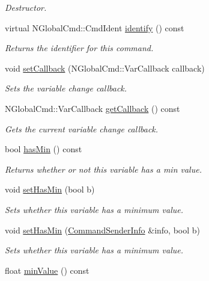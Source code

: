 \begin{DoxyCompactItemize}
\begin{DoxyCompactList}\small\item\em Destructor. \end{DoxyCompactList}\item 
virtual N\-Global\-Cmd\-::\-Cmd\-Ident \hyperlink{class_con_var_a0d2fb6068e6fa0ac6b1655327c453d6b}{identify} () const 
\begin{DoxyCompactList}\small\item\em Returns the identifier for this command. \end{DoxyCompactList}\item 
void \hyperlink{class_con_var_a7521050905d25ae719fc4e97924047ea}{set\-Callback} (N\-Global\-Cmd\-::\-Var\-Callback callback)
\begin{DoxyCompactList}\small\item\em Sets the variable change callback. \end{DoxyCompactList}\item 
N\-Global\-Cmd\-::\-Var\-Callback \hyperlink{class_con_var_a01a4f437684d3120d5a510b821b35f60}{get\-Callback} () const 
\begin{DoxyCompactList}\small\item\em Gets the current variable change callback. \end{DoxyCompactList}\item 
bool \hyperlink{class_con_var_abbd3524ea974888b57f1b8d96dbdb66b}{has\-Min} () const 
\begin{DoxyCompactList}\small\item\em Returns whether or not this variable has a min value. \end{DoxyCompactList}\item 
void \hyperlink{class_con_var_a01174fcd55542e8aae24bb8af63bff8e}{set\-Has\-Min} (bool b)
\begin{DoxyCompactList}\small\item\em Sets whether this variable has a minimum value. \end{DoxyCompactList}\item 
void \hyperlink{class_con_var_a6e2c60d93fbaaf01560cf68bf0524c4b}{set\-Has\-Min} (\hyperlink{class_command_sender_info}{Command\-Sender\-Info} \&info, bool b)
\begin{DoxyCompactList}\small\item\em Sets whether this variable has a minimum value. \end{DoxyCompactList}\item 
float \hyperlink{class_con_var_a7ff718a682ecd1f92539a8d4d4c478ac}{min\-Value} () const 

\end{DoxyCompactItemize}
